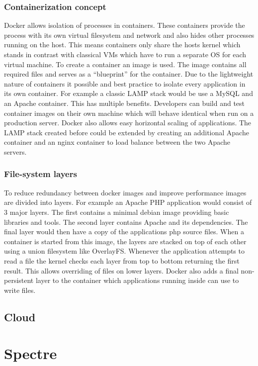 \documentclass[conference,compsoc,final,a4paper]{IEEEtran}
\begin{document}
\subsubsection{Containerization concept}
Docker allows isolation of processes in containers. These containers provide the process with its own virtual filesystem and network and also hides other processes
running on the host. This means containers only share the hosts kernel which stands in contrast with classical VMs which have to run a separate OS for each virtual
machine. To create a container an image is used. The image contains all required files and serves as a \enquote{blueprint} for the container. Due to the lightweight
nature of containers it possible and best practice to isolate every application in its own container. For example a classic LAMP stack would be use a MySQL
and an Apache container. This has multiple benefits. Developers can build and test container images on their own machine which will behave
identical when run on a production server. Docker also allows easy horizontal scaling of applications. The LAMP stack created before could be extended by
creating an additional Apache container and an nginx container to load balance between the two Apache servers.
\subsubsection{File-system layers}
To reduce redundancy between docker images and improve performance images are divided into layers. For example an Apache PHP application would consist of 3
major layers. The first contains a minimal debian image providing basic libraries and tools. The second layer contains Apache and its dependencies. The final
layer would then have a copy of the applications php source files. When a container is started from this image, the layers are stacked on top of each other 
using a union filesystem like OverlayFS\cite{overlayfs}. Whenever the application attempts to read a file the kernel checks each layer from top to bottom
returning the first result. This allows overriding of files on lower layers. Docker also adds a final non-persistent layer to the container which applications
running inside can use to write files.
\subsection{Cloud}


\section{Spectre}
\end{document}
